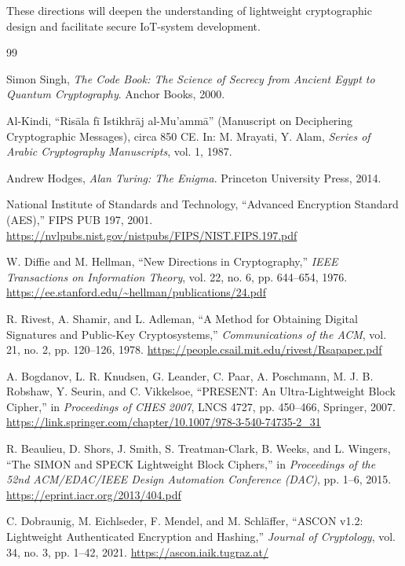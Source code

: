 \documentclass[12pt]{report}
\begin{document}
These directions will deepen the understanding of lightweight cryptographic design and facilitate secure IoT-system development.

\newpage

\begin{thebibliography}{99}

    Simon Singh, \textit{The Code Book: The Science of Secrecy from Ancient Egypt to Quantum Cryptography}. Anchor Books, 2000.

    Al-Kindi, ``Risāla fī Istikhrāj al-Mu'ammā'' (Manuscript on Deciphering Cryptographic Messages), circa 850 CE. In: M. Mrayati, Y. Alam, \textit{Series of Arabic Cryptography Manuscripts}, vol. 1, 1987.

    Andrew Hodges, \textit{Alan Turing: The Enigma}. Princeton University Press, 2014.

    National Institute of Standards and Technology, ``Advanced Encryption Standard (AES),'' FIPS PUB 197, 2001.
    \url{https://nvlpubs.nist.gov/nistpubs/FIPS/NIST.FIPS.197.pdf}

    W. Diffie and M. Hellman, ``New Directions in Cryptography,'' \textit{IEEE Transactions on Information Theory}, vol. 22, no. 6, pp. 644--654, 1976.
    \url{https://ee.stanford.edu/~hellman/publications/24.pdf}

    R. Rivest, A. Shamir, and L. Adleman, ``A Method for Obtaining Digital Signatures and Public-Key Cryptosystems,'' \textit{Communications of the ACM}, vol. 21, no. 2, pp. 120--126, 1978.
    \url{https://people.csail.mit.edu/rivest/Rsapaper.pdf}

    A. Bogdanov, L. R. Knudsen, G. Leander, C. Paar, A. Poschmann, M. J. B. Robshaw, Y. Seurin, and C. Vikkelsoe, ``PRESENT: An Ultra-Lightweight Block Cipher,'' in \textit{Proceedings of CHES 2007}, LNCS 4727, pp. 450--466, Springer, 2007.
    \url{https://link.springer.com/chapter/10.1007/978-3-540-74735-2_31}

    R. Beaulieu, D. Shors, J. Smith, S. Treatman-Clark, B. Weeks, and L. Wingers, ``The SIMON and SPECK Lightweight Block Ciphers,'' in \textit{Proceedings of the 52nd ACM/EDAC/IEEE Design Automation Conference (DAC)}, pp. 1--6, 2015.
    \url{https://eprint.iacr.org/2013/404.pdf}

    C. Dobraunig, M. Eichlseder, F. Mendel, and M. Schläffer, ``ASCON v1.2: Lightweight Authenticated Encryption and Hashing,'' \textit{Journal of Cryptology}, vol. 34, no. 3, pp. 1--42, 2021.
    \url{https://ascon.iaik.tugraz.at/}


\end{thebibliography}
\end{document}
